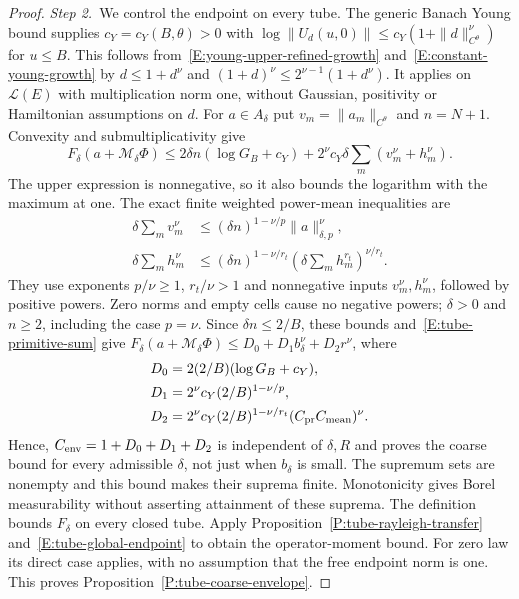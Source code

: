 \begin{proof}
  \medskip
  \noindent\textit{Step 2.~}We control the endpoint on every tube.
  The generic Banach Young bound supplies $c_Y = c_Y(B,\theta) > 0$ with
  $\log\|U_d(u,0)\| \le c_Y(1+\|d\|_{C^\theta}^{\nu})$ for $u \le B$. This
  follows from~\eqref{E:young-upper-refined-growth}
  and~\eqref{E:constant-young-growth} by $d \le 1+d^\nu$ and $(1+d)^\nu \le
  2^{\nu-1}(1+d^\nu)$. It applies on $\mathcal{L}(E)$ with multiplication norm
  one, without Gaussian, positivity or Hamiltonian assumptions on $d$. For $a
  \in A_\delta$ put $v_m = \|a_m\|_{C^\theta}$ and $n = N+1$. Convexity and
  submultiplicativity give
  \[
    F_\delta(a+\mathcal{M}_\delta\Phi)
    \le2\delta n(\log G_B+c_Y)
    +2^\nu c_Y\delta\sum_m(v_m^\nu+h_m^\nu).
  \]
  The upper expression is nonnegative, so it also bounds the logarithm with the
  maximum at one. The exact finite weighted power-mean inequalities are
  \begin{align*}
    \delta\sum_m v_m^\nu
    &\le(\delta n)^{1-\nu/p}\|a\|_{\delta,p}^\nu,\\
    \delta\sum_m h_m^\nu
    &\le(\delta n)^{1-\nu/r_t}
    \left(\delta\sum_m h_m^{r_t}\right)^{\nu/r_t}.
  \end{align*}
  They use exponents $p/\nu \ge 1$, $r_t/\nu > 1$ and nonnegative inputs
  $v_m^\nu,h_m^\nu$, followed by positive powers. Zero norms and empty cells
  cause no negative powers; $\delta > 0$ and $n \ge 2$, including the case $p =
  \nu$. Since $\delta n \le 2/B$, these bounds and~\eqref{E:tube-primitive-sum}
  give $F_\delta(a+\mathcal{M}_\delta\Phi) \le D_0+D_1b_\delta^\nu+D_2r^\nu$,
  where
  \begin{align*}
    D_0&=2(2/B)(\log G_B+c_Y),\\
    D_1&=2^\nu c_Y(2/B)^{1-\nu/p},\\
    D_2&=2^\nu c_Y(2/B)^{1-\nu/r_t}
    (C_{\rm pr}C_{\rm mean})^\nu .
  \end{align*}
  Hence, $C_{\rm env} = 1+D_0+D_1+D_2$ is independent of $\delta,R$ and proves
  the coarse bound for every admissible $\delta$, not just when $b_\delta$ is
  small. The supremum sets are nonempty and this bound makes their suprema
  finite. Monotonicity gives Borel measurability without asserting attainment of
  these suprema. The definition bounds $F_\delta$ on every closed tube. Apply
  Proposition~\ref{P:tube-rayleigh-transfer} and~\eqref{E:tube-global-endpoint}
  to obtain the operator-moment bound. For zero law its direct case applies,
  with no assumption that the free endpoint norm is one. This proves
  Proposition~\ref{P:tube-coarse-envelope}.
\end{proof}

